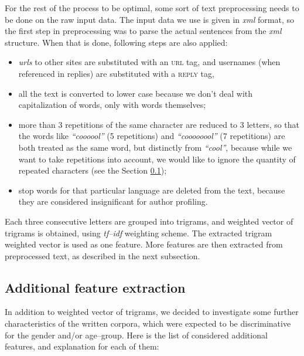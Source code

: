 \documentclass[10pt, a4paper]{article}
\begin{document}
For the rest of the process to be optimal, some sort of text preprocessing needs to be done on the raw input data.
The input data we use is given in \textit{xml} format, so the first step in preprocessing was to parse the actual sentences from the \textit{xml} structure.
When that is done, following steps are also applied:
\begin{itemize}
	\item \textit{urls} to other sites are substituted with an \textsc{url} tag, and usernames (when referenced in replies) are substituted with a \textsc{reply} tag,
	\item all the text is converted to lower case because we don't deal with capitalization of words, only with words themselves;
	\item more than 3 repetitions of the same character are reduced to 3 letters, so that the words like \textit{``coooool''} (5 repetitions) and \textit{``coooooool''} (7 repetitions) are both treated as the same word, but distinctly from \textit{``cool''}, because while we want to take repetitions into account, we would like to ignore the quantity of repeated characters (see the Section \ref{sec:features});
	\item stop words\citep{nltk} for that particular language are deleted from the text, because they are considered insignificant for author profiling.
\end{itemize}

Each three consecutive letters are grouped into trigrams, and weighted vector of trigrams is obtained, using \textit{tf--idf} weighting scheme.
The extracted trigram weighted vector is used as one feature.
More features are then extracted from preprocessed text, as described in the next subsection.

\subsection{Additional feature extraction}
\label{sec:features}
In addition to weighted vector of trigrams, we decided to investigate some further characteristics of the written corpora, which were expected to be discriminative for the gender and/or age--group.
Here is the list of considered additional features, and explanation for each of them:
\end{document}
